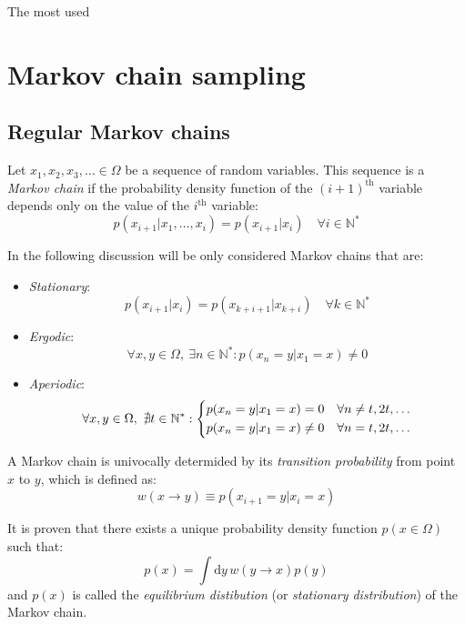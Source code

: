 The most used 


\section{Markov chain sampling}

\subsection*{Regular Markov chains}
Let $x_1, x_2, x_3, \ldots \in \Omega$ be a sequence of random variables.
This sequence is a \emph{Markov chain} if the probability density function of the $(i+1)^\mathrm{th}$
variable depends only on the value of the $i^\mathrm{th}$ variable:
\[
    p(x_{i+1}|x_1, \ldots, x_i) = p(x_{i+1}|x_i) \quad \forall i\in\mathbb N^*
\]

In the following discussion will be only considered Markov chains that are:
\begin{itemize}
    \item \emph{Stationary}:
        \[
            p(x_{i+1}|x_i) = p(x_{k+i+1}|x_{k+i}) \quad \forall k\in\mathbb N^*
        \]
    \item \emph{Ergodic}:
        \[
            \forall x,y \in \Omega,\ \exists n\in\mathbb N^* : p(x_n=y|x_1=x) \neq 0
        \]
    \item \emph{Aperiodic}:
        \[
            \forall x,y \in \Omega,\ \nexists t\in\mathbb N^* :
            \begin{dcases}
                p(x_n=y|x_1=x)=0 \quad \forall n\neq t,2t,\ldots \\
                p(x_n=y|x_1=x)\neq0 \quad \forall n=t,2t,\ldots
            \end{dcases}
        \]
\end{itemize}

A Markov chain is univocally determided by its \emph{transition probability} from point $x$ to $y$, which is defined as:
\begin{equation}\label{eq:transition}
    w(x \to y) \equiv p(x_{i+1}=y|x_i=x)
\end{equation}

It is proven \cite{mc-mt} that there exists a unique probability density function $p(x\in\Omega)$
such that:
\begin{equation}\label{eq:equilibrium}
	p(x) = \int\mathrm dy\,w(y \to x)p(y)
\end{equation}
and $p(x)$ is called the \emph{equilibrium distibution} (or \emph{stationary distribution}) of the Markov chain.

